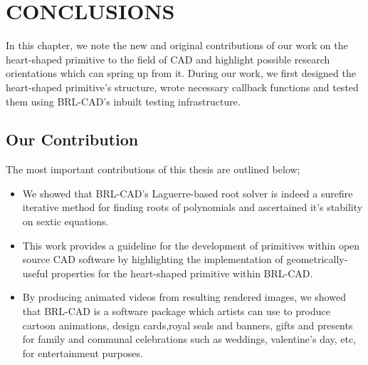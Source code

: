 \chapter{CONCLUSIONS}
\label{Conclusions}

\hspace{30} In   this   chapter,   we   note   the   new   and   original   contributions   of   our   work   on  
the   heart-­shaped   primitive   to   the   field   of   CAD   and   highlight  
possible   research   orientations   which   can   spring   up   from   it.   During   our   work,   we  
first   designed   the   heart­-shaped   primitive's   structure,   wrote   necessary   callback  
functions and tested them using BRL-­CAD's inbuilt testing infrastructure. 


\section{Our Contribution}

The most important contributions of this thesis are outlined below;  

\begin{itemize}
\item We   showed   that   BRL-­CAD's   Laguerre-­based   root   solver   is   indeed   a  
sure­fire   iterative   method   for   finding   roots   of   polynomials   and   ascertained  
it's stability on sextic equations.  
\item This   work   provides   a   guideline   for   the   development   of   primitives   within  
open   source   CAD   software   by   highlighting   the  implementation   of   
geometrically­ useful properties for the heart-shaped primitive within BRL-­CAD.  
\item By   producing   animated   videos   from   resulting   rendered   images,   we  
showed   that   BRL­-CAD   is   a   software   package   which   artists   can   use   to  
produce   cartoon   animations,   design   cards,royal   seals   and   banners,   gifts  
and   presents   for   family   and   communal   celebrations   such   as   weddings,  
valentine's day, etc, for entertainment purposes.
\end{itemize}


